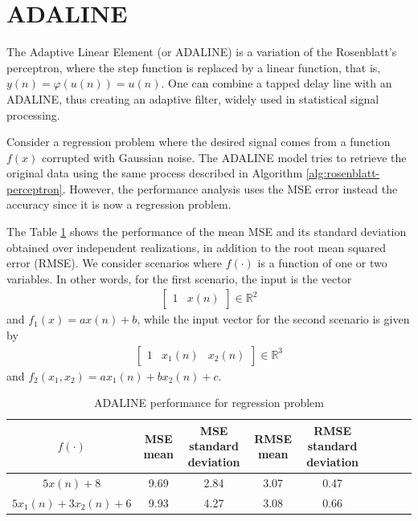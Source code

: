 \documentclass[12pt,a4paper]{article}
\newcommand{\Real}{\mathbb{R}}
\begin{document}
\section{ADALINE}

The Adaptive Linear Element (or ADALINE) is a variation of the Rosenblatt's perceptron, where the step function is replaced by a linear function, that is, \(y(n) = \varphi(u(n)) = u(n)\). One can combine a tapped delay line with an ADALINE, thus creating an adaptive filter, widely used in statistical signal processing.

Consider a regression problem where the desired signal comes from a function \(f(x)\) corrupted with Gaussian noise. The ADALINE model tries to retrieve the original data using the same process described in Algorithm \ref{alg:rosenblatt-perceptron}. However, the performance analysis uses the MSE error instead the accuracy since it is now a regression problem.

The Table \ref{tab:adaline-results} shows the performance of the mean MSE and its standard deviation obtained over independent realizations, in addition to the root mean squared error (RMSE). We consider scenarios where \(f(\cdot)\) is a function of one or two variables. In other words, for the first scenario, the input is the vector
\begin{align}
    \begin{bmatrix}
        1 & x(n)
    \end{bmatrix} \in \Real^2
\end{align}
and \(f_1(x) = ax(n)+b\), while the input vector for the second scenario is given by
\begin{align}
    \begin{bmatrix}
        1 & x_1(n) & x_2(n)
    \end{bmatrix} \in \Real^3
\end{align}
and \(f_2(x_1, x_2) = ax_1(n)+bx_2(n)+c\).

\begin{table}[H]
	\centering
	\caption{ADALINE performance for regression problem}
	\footnotesize
	\setlength{\tabcolsep}{5pt}
	\begin{tabular}{ccccccccc}
		\hline
		\(f(\cdot)\) & MSE mean & MSE standard deviation & RMSE mean & RMSE standard deviation \\
		\hline
		\(5x(n)+8\) & 9.69 & 2.84 & 3.07 & 0.47 \\
        \hline
		\(5x_1(n)+3x_2(n)+6\) & 9.93 & 4.27 & 3.08 & 0.66 \\
		\hline
	\end{tabular} \label{tab:adaline-results}
\end{table}
\end{document}
